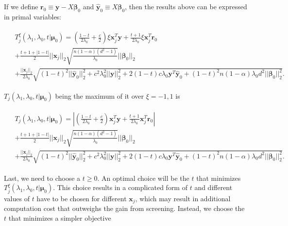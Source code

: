 If we define $\boldsymbol r_0\equiv \boldsymbol y-X\boldsymbol\beta_{0}$ and $\hat{\boldsymbol y}_{0}\equiv X\boldsymbol\beta_{0}$, then the results above can be expressed in primal variables:

\begin{gather}
    \begin{aligned}
        &T^\xi_j(\lambda_1,\lambda_0,t|\boldsymbol\mu_0)=  \left(\frac{1-t}{2\lambda_0}+\frac{c}{2}\right)\xi\boldsymbol x_j^T \boldsymbol y+\frac{t+1}{2\lambda_0}\xi \boldsymbol x_j^T \boldsymbol r_{0}\\
        &+\frac{t+1+|1-t|}{2}||\boldsymbol x_j||_2\sqrt{\frac{n(1-\alpha) (d^2-1)}{\lambda_0}}||\boldsymbol\beta_{0}||_2\\
        &+\frac{||\boldsymbol x_j||_2}{2\lambda_0}\sqrt{(1-t)^2||\hat{\boldsymbol y}_{0}||_2^2+c^2\lambda_0^2||\boldsymbol y||_2^2+2(1-t)c\lambda_0 \boldsymbol y^T\hat{\boldsymbol y}_{0}+(1-t)^2n(1-\alpha)\lambda_0d^2||\boldsymbol\beta_{0}||_2^2}.
    \end{aligned}
\end{gather}

$T_j(\lambda_1,\lambda_0,t|\boldsymbol\mu_0)$ being the maximum of it over $\xi=-1,1$ is

\begin{gather}
    \label{eq:t}
    \begin{aligned}
        &T_j(\lambda_1,\lambda_0,t|\boldsymbol\mu_0)= \left| \left(\frac{1-t}{2\lambda_0}+\frac{c}{2}\right)\boldsymbol x_j^T \boldsymbol y+\frac{t+1}{2\lambda_0} \boldsymbol x_j^T \boldsymbol r_{0}\right|\\
        &+\frac{t+1+|1-t|}{2}||\boldsymbol x_j||_2\sqrt{\frac{n(1-\alpha) (d^2-1)}{\lambda_0}}||\boldsymbol\beta_{0}||_2\\
        &+\frac{||\boldsymbol x_j||_2}{2\lambda_0}\sqrt{(1-t)^2||\hat{\boldsymbol y}_{0}||_2^2+c^2\lambda_0^2||\boldsymbol y||_2^2+2(1-t)c\lambda_0 \boldsymbol y^T\hat{\boldsymbol y}_{0}+(1-t)^2n(1-\alpha)\lambda_0d^2||\boldsymbol\beta_{0}||_2^2}.
    \end{aligned}
\end{gather}

Last, we need to choose a $t\geq 0$. An optimal choice will be the $t$ that minimizes $T^\xi_j(\lambda_1,\lambda_0,t|\boldsymbol\mu_0)$. This choice results in a complicated form of $t$ and different values of $t$ have to be chosen for different $\boldsymbol x_j$, which may result in additional computation cost that outweighs the gain from screening. Instead, we choose the $t$ that minimizes a simpler objective

